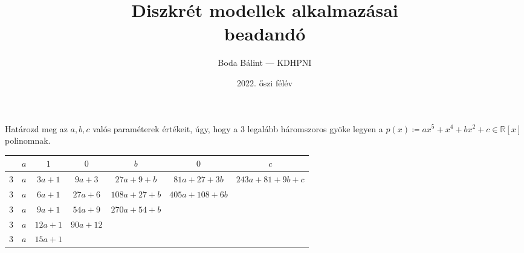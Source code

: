 \documentclass[a4paper,12pt]{article}
\title{\huge{Diszkrét modellek alkalmazásai} \\[-4pt] \large beadandó \vspace{-15pt}}
\author{Boda Bálint — KDHPNI}
\date{\vspace{-12pt}2022. őszi félév}
\theoremstyle{definition}
\begin{document}
    \maketitle
    \vspace{-10pt}
\begin{question}
	Határozd meg az $a,b,c$ valós paraméterek értékeit, úgy, hogy a 3 legalább háromszoros gyöke legyen a $p(x) \coloneq ax^5 + x^4 + bx^2 + c \in \mathbb{R}[x] $ polinomnak.
\end{question}
\begin{solution}
	\begin{table}[H]
		\centering
		\begin{tabular}{|c|c|c|c|c|c|c|}
			\hline
			$ $ & $ a $ & $ 1 $  & $ 0 $  & $ b $  & $ 0 $ & $ c $  \\
			\hline
			$ 3 $ & $a$ & $3a + 1$ & $ 9a+ 3 $ & $27a + 9 + b$ & $81a + 27 + 3b $ & $243a + 81 + 9b + c $ \\
			\hline
			$ 3 $ & $a$ & $6a + 1$ & $ 27a+ 6 $ & $108a + 27 + b$ & $405a + 108 + 6b $ &  \\
			\hline
			$ 3 $ & $a$ & $9a + 1$ & $ 54a+ 9 $ & $270a + 54 + b$ &  &  \\
			\hline
			$ 3 $ & $a$ & $12a + 1$ & $ 90a+ 12 $ & &  &  \\
			\hline
			$ 3 $ & $a$ & $15a + 1$ & & &  &  \\
			\hline
		\end{tabular}
	\end{table}


\end{solution}
\end{document}
